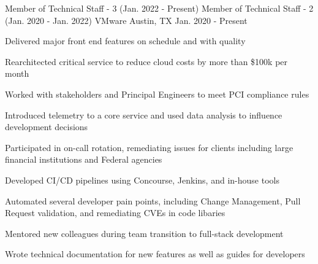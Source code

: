

\begin{cventryroles}

  \cventryroles
    {Member of Technical Staff - 3 (Jan. 2022 - Present)}
    {Member of Technical Staff - 2 (Jan. 2020 - Jan. 2022)}
    {VMware} %
    {Austin, TX} %
    {Jan. 2020 - Present}
    {
      \begin{cvitems} %
        \item {Delivered major front end features on schedule and with quality}
        \item {Rearchitected critical service to reduce cloud costs by more than \$100k per month}
        \item {Worked with stakeholders and Principal Engineers to meet PCI compliance rules}
        \item {Introduced telemetry to a core service and used data analysis to influence development decisions}
        \item {Participated in on-call rotation, remediating issues for clients including large financial institutions and Federal agencies}
        \item {Developed CI/CD pipelines using Concourse, Jenkins, and in-house tools}
        \item {Automated several developer pain points, including Change Management, Pull Request validation, and remediating CVEs in code libaries}
        \item {Mentored new colleagues during team transition to full-stack development}
        \item {Wrote technical documentation for new features as well as guides for developers}
      \end{cvitems}
    }
\end{cventryroles}

